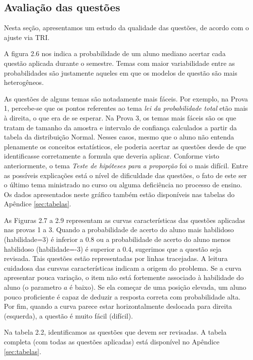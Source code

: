 \documentclass[a4paper]{report}
\begin{document}
\subsection{Avaliação das questões} \label{subsec:banco}

Nesta seção, apresentamos um estudo da qualidade das questões, de acordo
com o ajuste via TRI.

A figura 2.6 nos indica a probabilidade de um aluno mediano acertar cada
questão aplicada durante o semestre. Temas com maior variabilidade entre
as probabilidades são justamente aqueles em que os modelos de questão
são mais heterogêneos.

As questões de alguns temas são notadamente mais fáceis. Por exemplo, na
Prova 1, percebe-se que os pontos referentes ao tema
\emph{lei da probabilidade total} etão mais à direita, o que era de se
esperar. Na Prova 3, os temas mais fáceis são os que tratam de tamanho
da amostra e intervalo de confiança calculados a partir da tabela da
distribuição Normal. Nesses casos, mesmo que o aluno não entenda
plenamente os conceitos estatísticos, ele poderia acertar as questões
desde de que identificasse corretamente a formula que deveria aplicar.
Conforme visto anteriormente, o tema
\emph{Teste de hipóteses para a proporção} foi o mais difícil. Entre as
possíveis explicações está o nível de dificuldade das questões, o fato
de este ser o último tema ministrado no curso ou alguma deficiência no
processo de ensino. Os dados apresentados neste gráfico também estão
disponíveis nas tabelas do Apêndice \ref{sec:tabelas}.

As Figuras 2.7 a 2.9 representam as curvas características das questões
aplicadas nas provas 1 a 3. Quando a probabilidade de acerto do aluno
mais habilidoso (habilidade=3) é inferior a 0.8 ou a probabilidade de
acerto do aluno menos habilidoso (habilidade=-3) é superior a 0.4,
sugerimos que a questão seja revisada. Tais questões estão representadas
por linhas tracejadas. A leitura cuidadosa das cursvas características
indicam a origem do problema. Se a curva apresentar pouca variação, o
item não está fortemente associado à habilidade do aluno (o parametro
\(a\) é baixo). Se ela começar de uma posição elevada, um aluno pouco
proficiente é capaz de deduzir a resposta correta com probabilidade
alta. Por fim, quando a curva parece estar horizontalmente deslocada
para direita (esquerda), a questão é muito fácil (difícil).

Na tabela 2.2, identificamos as questões que devem ser revisadas. A
tabela completa (com todas as questões aplicadas) está disponível no
Apêndice \ref{sec:tabelas}.
\end{document}
